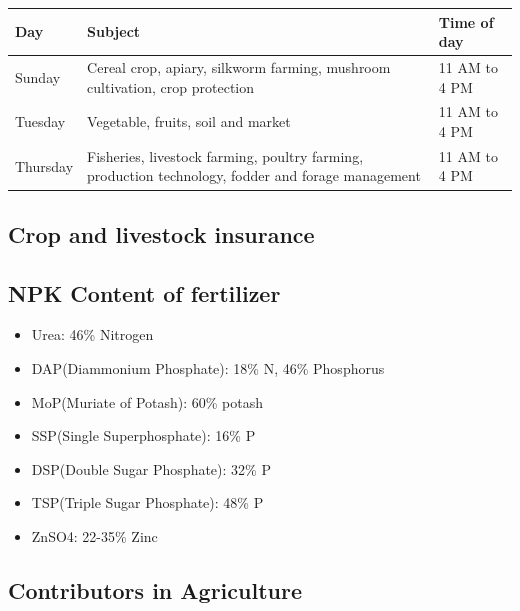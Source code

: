\documentclass[
  openany]{book}
\providecommand{\tightlist}{%
  \setlength{\itemsep}{0pt}\setlength{\parskip}{0pt}}
\begin{document}
\begin{table}[H]
\centering\begingroup\fontsize{10}{12}\selectfont

\begin{tabular}{l>{\raggedright\arraybackslash}p{16em}l}
\toprule
Day & Subject & Time of day\\
\midrule
Sunday & Cereal crop, apiary, silkworm farming, mushroom cultivation, crop protection & 11 AM to 4 PM\\
Tuesday & Vegetable, fruits, soil and market & 11 AM to 4 PM\\
Thursday & Fisheries, livestock farming, poultry farming, production technology, fodder and forage management & 11 AM to 4 PM\\
\bottomrule
\end{tabular}
\endgroup{}
\end{table}

\hypertarget{crop-and-livestock-insurance}{%
\subsection{Crop and livestock insurance}\label{crop-and-livestock-insurance}}

\hypertarget{npk-content-of-fertilizer}{%
\subsection{NPK Content of fertilizer}\label{npk-content-of-fertilizer}}

\begin{itemize}
\tightlist
\item
  Urea: 46\% Nitrogen
\item
  DAP(Diammonium Phosphate): 18\% N, 46\% Phosphorus
\item
  MoP(Muriate of Potash): 60\% potash
\item
  SSP(Single Superphosphate): 16\% P
\item
  DSP(Double Sugar Phosphate): 32\% P
\item
  TSP(Triple Sugar Phosphate): 48\% P
\item
  ZnSO4: 22-35\% Zinc
\end{itemize}

\hypertarget{contributors-in-agriculture}{%
\subsection{Contributors in Agriculture}\label{contributors-in-agriculture}}
\end{document}
